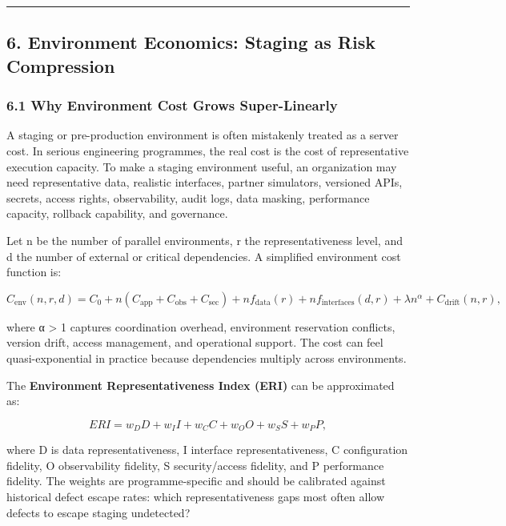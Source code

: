 \documentclass[
]{article}
\begin{document}
\begin{center}\rule{0.5\linewidth}{0.5pt}\end{center}

\subsection{6. Environment Economics: Staging as Risk
Compression}\label{environment-economics-staging-as-risk-compression}

\subsubsection{6.1 Why Environment Cost Grows
Super-Linearly}\label{why-environment-cost-grows-super-linearly}

A staging or pre-production environment is often mistakenly treated as a
server cost. In serious engineering programmes, the real cost is the
cost of representative execution capacity. To make a staging environment
useful, an organization may need representative data, realistic
interfaces, partner simulators, versioned APIs, secrets, access rights,
observability, audit logs, data masking, performance capacity, rollback
capability, and governance.

Let n be the number of parallel environments, r the representativeness
level, and d the number of external or critical dependencies. A
simplified environment cost function is:

\[C_{\mathrm{env}}(n,r,d) = C_0 + n(C_{\mathrm{app}} + C_{\mathrm{obs}} + C_{\mathrm{sec}}) + n f_{\mathrm{data}}(r) + n f_{\mathrm{interfaces}}(d,r) + \lambda n^{\alpha} + C_{\mathrm{drift}}(n,r),\]

where α \textgreater{} 1 captures coordination overhead, environment
reservation conflicts, version drift, access management, and operational
support. The cost can feel quasi-exponential in practice because
dependencies multiply across environments.

The \textbf{Environment Representativeness Index (ERI)} can be
approximated as:

\[ERI = w_D D + w_I I + w_C C + w_O O + w_S S + w_P P,\]

where D is data representativeness, I interface representativeness, C
configuration fidelity, O observability fidelity, S security/access
fidelity, and P performance fidelity. The weights are programme-specific
and should be calibrated against historical defect escape rates: which
representativeness gaps most often allow defects to escape staging
undetected?
\end{document}
